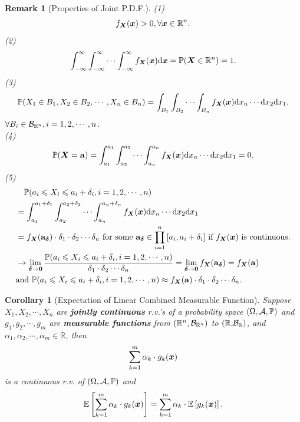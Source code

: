 \documentclass[openany,12pt]{book}
\newtheorem{corollary}{Corollary}[chapter]
\newtheorem{remark}{Remark}[chapter]
\begin{document}
\begin{remark}[Properties of Joint P.D.F.]
  (1)
  \[f_{\bm{X}}(\bm{x}) > 0, \forall\bm{x} \in \mathbb{R}^{n}.\]
  (2)
  \[\int_{- \infty}^{\infty}{\int_{- \infty}^{\infty}{\cdots\int_{- \infty}^{\infty}{f_{\bm{X}}(\bm{x})\mathrm{d}\bm{x}}}} = \mathbb{P}(\bm{X} \in \mathbb{R}^{n})= 1.\]
  (3)
  \[\mathbb{P}( X_{1} \in B_{1},X_{2} \in B_{2}, \cdots,X_{n} \in B_{n})= \int_{B_{1}}^{}{\int_{B_{2}}^{}{\cdots\int_{B_{n}}^{}{f_{\bm{X}}(\bm{x})\mathrm{d} x_{n}\cdots \mathrm{d} x_{2}}}}\mathrm{d} x_{1},\]
  $\forall B_{i} \in \mathcal{B}_{\mathbb{R}^{n}}, i = 1,2, \cdots,n$.\\
  (4)
  \[\mathbb{P}(\bm{X} = \mathbf{a})= \int_{a_{1}}^{a_{1}}{\int_{a_{2}}^{a_{2}}{\cdots\int_{a_{n}}^{a_{n}}{f_{\bm{X}}(\bm{x})\mathrm{d} x_{n}\cdots \mathrm{d} x_{2}}}}\mathrm{d} x_{1} = 0.\]
  (5)
  \[\begin{aligned}
       & \quad  \mathbb{P}(a_{i} \leqslant X_{i} \leqslant a_{i} + \delta_{i}, i = 1,2, \cdots,n)                                                                                                                                                                                  \\
       & = \int_{a_{1}}^{a_{1} + \delta_{1}}{\int_{a_{2}}^{a_{2} + \delta_{2}}{\cdots\int_{a_{n}}^{a_{n} + \delta_{n}}{f_{\bm{X}}(\bm{x})\mathrm{d} x_{n}\cdots \mathrm{d} x_{2}}}}\mathrm{d} x_{1}                                                                                            \\
       & = f_{\bm{X}}( {\mathbf{a}}_{\bm{\delta}}) \cdot \delta_{1} \cdot \delta_{2} \cdots\delta_{n} \text{ for some }{\mathbf{a}}_{\bm{\delta}} \in \prod_{i = 1}^{n}{[ a_{i},a_{i} + \delta_{i}]} \text{ if } f_{\bm{X}}(\bm{x}) \text{ is continuous}.                     \\
       & \to \lim_{\bm{\delta}\to\mathbf{0}}\frac{\mathbb{P}(a_{i} \leqslant X_{i} \leqslant a_{i} + \delta_{i}, i = 1,2, \cdots,n)}{\delta_{1} \cdot \delta_{2} \cdots \delta_{n}} = \lim_{\bm{\delta}\to\mathbf{0}}{f_{\bm{X}}( {\mathbf{a}}_{\bm{\delta}})} = f_{\bm{X}}(\mathbf{a}) \\
       & \text{and } \mathbb{P}(a_{i} \leqslant X_{i} \leqslant a_{i} + \delta_{i}, i = 1,2, \cdots,n) \approx f_{\bm{X}}(\mathbf{a}) \cdot \delta_{1} \cdot \delta_{2} \cdots\delta_{n}.                                                                                             \\
    \end{aligned}\]
\end{remark}

\begin{corollary}[Expectation of Linear Combined Measurable Function]
  Suppose $X_{1}, X_{2}, \cdots,X_{n}$ are \textbf{jointly continuous}
  r.v.'s of a probability space $(\Omega,\mathcal{A},\mathbb{P})$ and $g_{1}, g_{2}, \cdots, g_{m}$ are \textbf{measurable functions} from $(\mathbb{R}^{n}, \mathcal{B}_{\mathbb{R}^{n}})$ to $\mathbb{(R,}\mathcal{B}_{\mathbb{R}})$, and $\alpha_{1},\alpha_{2}, \cdots,\alpha_{m} \in \mathbb{R}$, then
  \[\sum_{k = 1}^{m}\alpha_{k}\cdot g_{k}(\bm{x})
  \]
  is a continuous r.v. of $(\Omega,\mathcal{A},\mathbb{P})$ and
  \[\mathbb{E}\left[ \sum_{k = 1}^{m}\alpha_{k}\cdot g_{k}(\bm{x}) \right] = \sum_{k = 1}^{m}\alpha_{k}\cdot \mathbb{E}\left[ g_{k}(\bm{x}) \right].\]
\end{corollary}
\end{document}

